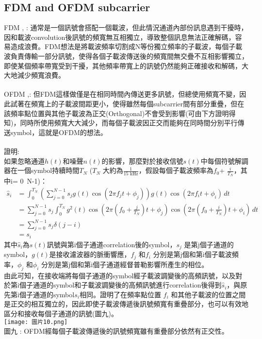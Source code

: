 \documentclass[12pt,a4paper]{article} %
\begin{document}
\subsection{FDM and OFDM subcarrier}
FDM \cite{goldsmith2005wireless},\cite{FDMOFDM1} : 通常是一個訊號會搭配一個載波，但此情況通道內部份訊息遇到干擾時，因和載波convolution後訊號的頻寬無互相獨立，導致整個訊息無法正確解碼，容易造成浪費。FDM想法是將載波頻率切割成N等份獨立頻率的子載波，每個子載波負責傳輸一部分訊號，使得各個子載波傳送後的頻寬間無交疊不互相影響獨立，即使某個頻率帶寬受到干擾，其他頻率帶寬上的訊號仍然能夠正確接收和解碼，大大地減少頻寬浪費。\\
\\
OFDM \cite{goldsmith2005wireless},\cite{FDMOFDM1}: 但FDM這樣做僅是在相同時間內傳送更多訊號，但總使用頻寬不變，因此試著在頻寬上的子載波間距更小，使得雖然每個subcarrier間有部分重疊，但在該頻率點位置與其他子載波為正交(Orthogonal)不會受到影響(可由下方證明得知)，同時所使用頻寬大大減少，而每個子載波因正交而能夠在同時間分別平行傳送symbol，這就是OFDM的想法。\\
\\
證明\cite{goldsmith2005wireless}:\\
如果忽略通道$h(t)$和噪聲$n(t)$的影響，那麼對於接收信號$s(t)$中每個符號解調器在一個symbol持續時間$T_N$ ($T_N$ 大約為$\frac{1}{15 \text{ kHz}}$，假設每個子載波頻率為$f_0$+ $\frac{i}{T_N}$，其中i= 0~N-1)：\\
\begin{align*}
\hat{s}_i &= \int_{0}^{T_N} \left( \sum_{j=0}^{N-1} s_j g(t) \cos(2\pi f_j t + \phi_j) \right) g(t) \cos(2\pi f_i t + \phi_i) \, dt \\
&= \sum_{j=0}^{N-1} s_j \int_{0}^{T_N} g^2(t) \cos\left(2\pi \left(f_0 + \frac{j}{T_N}\right)t + \phi_j\right) \cos\left(2\pi \left(f_0 + \frac{i}{T_N}\right)t + \phi_i\right) \, dt \\
&= \sum_{j=0}^{N-1} s_j \delta(j-i) \\
&= s_i
\end{align*}
\setlength\parindent{0pt}其中$\hat{s}_i$為$s(t)$訊號與第i個子通道correlation後的symbol，$s_j$ 是第j個子通道的symbol，$g(t)$是接收濾波器的脈衝響應，$f_j$ 和$f_i$ 分別是第j個和第i個子載波頻率，$\phi_j$ 和$\phi_i$ 分別是第j個和第i個子通道經督普勒影響\cite{goldsmith2005wireless}所產生的相位。\\
由此可知，在接收端將每個子通道的symbol經子載波調變後的高頻訊號，以及對於第i個子通道的symbol和子載波調變後的高頻訊號進行correlation後得到$\hat{s}_i$，與原先第i個子通道的symbol$s_i$相同。證明了在頻率點位置 $f_i$  和其他子載波的位置之間是正交的相互獨立的，因此即使子載波傳遞後訊號頻寬有重疊部分，也可以有效地區分和接收每個子通道的訊號(圖九)。\\
\texttt{[image: 圖片10.png]}\\
圖九 : OFDM經每個子載波傳遞後的訊號頻寬雖有重疊部分依然有正交性\cite{FDMOFDM2}。
\newpage
\end{document}
